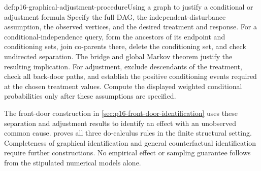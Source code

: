 \begin{hbmethod}{def:p16-graphical-adjustment-procedure}{Using a graph to justify a conditional or adjustment formula}
Specify the full DAG, the independent-disturbance assumption, the
observed vertices, and the desired treatment and response. For a
conditional-independence query, form the ancestors of its endpoint and
conditioning sets, join co-parents there, delete the conditioning set,
and check undirected separation. The bridge and global Markov theorem
justify the resulting implication. For adjustment, exclude descendants
of the treatment, check all back-door paths, and establish the positive
conditioning events required at the chosen treatment values. Compute
the displayed weighted conditional probabilities only after these
assumptions are specified.
\end{hbmethod}

The front-door construction in \cref{sec:p16-front-door-identification}
uses these separation and adjustment results to identify an effect with
an unobserved common cause.  proves
all three do-calculus rules in the finite structural setting.
Completeness of graphical identification and general counterfactual
identification require further constructions. No empirical effect or
sampling guarantee follows from the stipulated numerical models alone.
